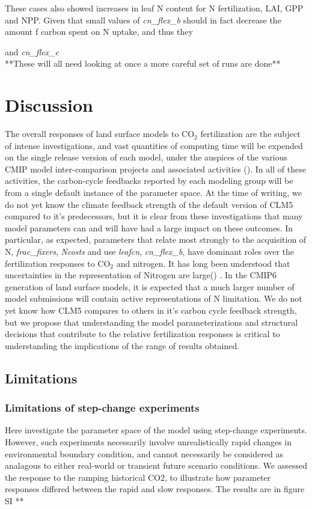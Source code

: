 \documentclass[draft,linenumbers]{agujournal}
\begin{document}
These cases also showed increases in leaf N content for N fertilization, LAI, GPP and NPP. Given that small values of  \emph{cn\_flex\_b} should in fact decrease the amount f carbon spent on N uptake, and thus they 


and \emph{cn\_flex\_c}\\
**These will all need looking at once a more careful set of runs are done**



\section{Discussion}
The overall responses of land surface models to CO$_{2}$ fertilization are the subject of intense investigations, and vast quantities of computing time will be expended on the single release version of each model, under the auspices of the various CMIP model inter-comparison projects and associated activities  (\cite{meehl2014}).  In all of these activities, the carbon-cycle feedbacks reported by each modeling group will be from a single default instance of the parameter space.  At the time of writing, we do not yet know the climate feedback strength of the default version of CLM5 compared to it's predecessors, but it is clear from these investigations that many model parameters can and will have had a large impact on these outcomes.  In particular, as expected, parameters that relate most strongly to the acquisition of N, \emph{frac\_fixers}, \emph{Ncosts} and use \emph{leafcn}, \emph{cn\_flex\_b}, have dominant roles over the fertilization responses to CO$_{2}$ and nitrogen.  It has long been understood that uncertainties in the representation of Nitrogen are large(\cite{zaehle2014}) . In the CMIP6 generation of land surface models, it is expected that a much larger number of model submissions will contain active representations of N limitation. We do not yet know how CLM5 compares to others in it's carbon cycle feedback strength, but we propose that understanding the model parameterizations and structural decisions that contribute to the relative fertilization responses is critical to understanding the implications of the range of results obtained. 

\subsection{Limitations}
\subsubsection{Limitations of step-change experiments}
Here investigate the parameter space of the model using step-change experiments. However, such experiments necessarily involve unrealistically rapid changes in environmental boundary condition, and cannot necessarily be considered as analagous to either real-world or transient future scenario conditions. We assessed the response to the ramping historical CO2, to illustrate how parameter responses differed between the rapid and slow responses. The results are in figure SI **
\end{document}
